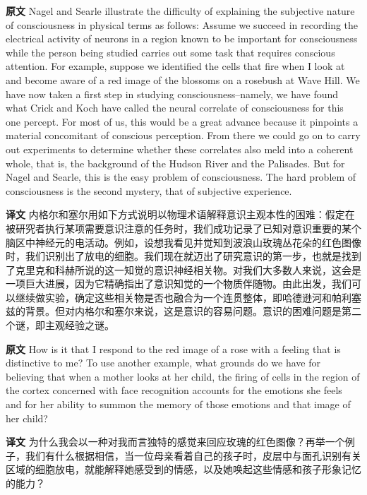 \documentclass[UTF8,zihao=-4]{ctexart}
\newcommand{\BodyFont}{\fontsize{10.5pt}{15.5pt}\selectfont}
\newcommand{\origlabel}{\textbf{原文}\quad}
\newcommand{\translabel}{\textbf{译文}\quad}
\newenvironment{enblock}{\par\noindent\begingroup\BodyFont\origlabel}{\par\endgroup}
\newenvironment{zhblock}{\par\noindent\begingroup\BodyFont\translabel}{\par\endgroup\vspace{0.35em}}
\begin{document}
\begin{enblock}
Nagel and Searle illustrate the difficulty of explaining the subjective nature of consciousness in physical terms as follows: Assume we succeed in recording the electrical activity of neurons in a region known to be important for consciousness while the person being studied carries out some task that requires conscious attention. For example, suppose we identified the cells that fire when I look at and become aware of a red image of the blossoms on a rosebush at Wave Hill. We have now taken a first step in studying consciousness--namely, we have found what Crick and Koch have called the neural correlate of consciousness for this one percept. For most of us, this would be a great advance because it pinpoints a material concomitant of conscious perception. From there we could go on to carry out experiments to determine whether these correlates also meld into a coherent whole, that is, the background of the Hudson River and the Palisades. But for Nagel and Searle, this is the easy problem of consciousness. The hard problem of consciousness is the second mystery, that of subjective experience.
\end{enblock}
\begin{zhblock}
内格尔和塞尔用如下方式说明以物理术语解释意识主观本性的困难：假定在被研究者执行某项需要意识注意的任务时，我们成功记录了已知对意识重要的某个脑区中神经元的电活动。例如，设想我看见并觉知到波浪山玫瑰丛花朵的红色图像时，我们识别出了放电的细胞。我们现在就迈出了研究意识的第一步，也就是找到了克里克和科赫所说的这一知觉的意识神经相关物。对我们大多数人来说，这会是一项巨大进展，因为它精确指出了意识知觉的一个物质伴随物。由此出发，我们可以继续做实验，确定这些相关物是否也融合为一个连贯整体，即哈德逊河和帕利塞兹的背景。但对内格尔和塞尔来说，这是意识的容易问题。意识的困难问题是第二个谜，即主观经验之谜。\end{zhblock}

\begin{enblock}
How is it that I respond to the red image of a rose with a feeling that is distinctive to me? To use another example, what grounds do we have for believing that when a mother looks at her child, the firing of cells in the region of the cortex concerned with face recognition accounts for the emotions she feels and for her ability to summon the memory of those emotions and that image of her child?
\end{enblock}
\begin{zhblock}
为什么我会以一种对我而言独特的感觉来回应玫瑰的红色图像？再举一个例子，我们有什么根据相信，当一位母亲看着自己的孩子时，皮层中与面孔识别有关区域的细胞放电，就能解释她感受到的情感，以及她唤起这些情感和孩子形象记忆的能力？\end{zhblock}
\end{document}

